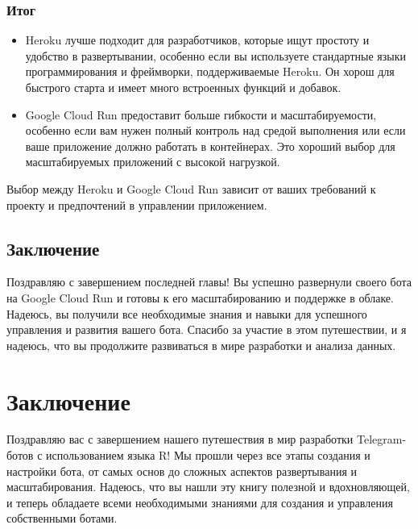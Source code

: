 \documentclass[
]{book}
\providecommand{\tightlist}{%
  \setlength{\itemsep}{0pt}\setlength{\parskip}{0pt}}
\begin{document}
\subsection{Итог}\label{ux438ux442ux43eux433}

\begin{itemize}
\tightlist
\item
  Heroku лучше подходит для разработчиков, которые ищут простоту и удобство в развертывании, особенно если вы используете стандартные языки программирования и фреймворки, поддерживаемые Heroku. Он хорош для быстрого старта и имеет много встроенных функций и добавок.
\item
  Google Cloud Run предоставит больше гибкости и масштабируемости, особенно если вам нужен полный контроль над средой выполнения или если ваше приложение должно работать в контейнерах. Это хороший выбор для масштабируемых приложений с высокой нагрузкой.
\end{itemize}

Выбор между Heroku и Google Cloud Run зависит от ваших требований к проекту и предпочтений в управлении приложением.

\section{Заключение}\label{ux437ux430ux43aux43bux44eux447ux435ux43dux438ux435-8}

Поздравляю с завершением последней главы! Вы успешно развернули своего бота на Google Cloud Run и готовы к его масштабированию и поддержке в облаке. Надеюсь, вы получили все необходимые знания и навыки для успешного управления и развития вашего бота. Спасибо за участие в этом путешествии, и я надеюсь, что вы продолжите развиваться в мире разработки и анализа данных.

\chapter*{Заключение}\label{ux437ux430ux43aux43bux44eux447ux435ux43dux438ux435-9}

Поздравляю вас с завершением нашего путешествия в мир разработки Telegram-ботов с использованием языка R! Мы прошли через все этапы создания и настройки бота, от самых основ до сложных аспектов развертывания и масштабирования. Надеюсь, что вы нашли эту книгу полезной и вдохновляющей, и теперь обладаете всеми необходимыми знаниями для создания и управления собственными ботами.
\end{document}
